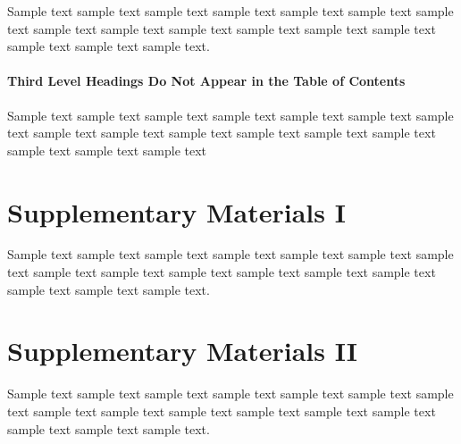 \documentclass[11pt]{uonthesis}
\begin{document}
Sample text sample text sample text sample text sample text sample
text sample text sample text sample text sample text sample text
sample text sample text sample text sample text sample text.



\subsubsection{Third Level Headings Do Not Appear in the Table of Contents}

Sample text sample text sample text sample text sample text sample
text sample text sample text sample text sample text sample text
sample text sample text sample text sample text sample text~\cite{Lam94}


\begin{appendices}

\chapter{Supplementary Materials I}

Sample text sample text sample text sample text sample text sample
text sample text sample text sample text sample text sample text
sample text sample text sample text sample text sample text.

\chapter{Supplementary Materials II}

Sample text sample text sample text sample text sample text sample
text sample text sample text sample text sample text sample text
sample text sample text sample text sample text sample text.

\end{appendices}
\end{document}
